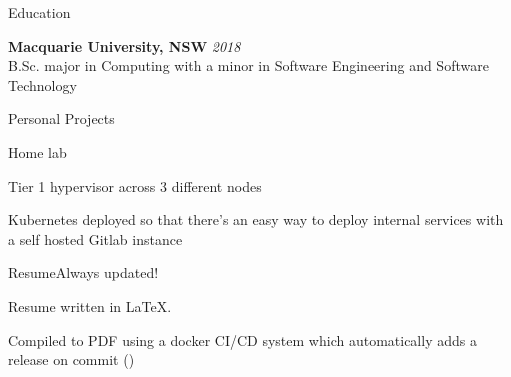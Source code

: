 \documentclass{resume} %
\begin{document}
    
    \begin{rSection}{Education}
    
        {\bf Macquarie University, NSW} \hfill {\em 2018} \\ 
        B.Sc. major in Computing with a minor in Software Engineering and Software Technology\\
        
        \end{rSection}
    
    
    \begin{rSection}{Personal Projects}
    
   
   
    \begin{rSubsection}{Home lab}{}{}{}{}{}
    \item Tier 1 hypervisor across 3 different nodes
    \item Kubernetes deployed so that there's an easy way to deploy internal services with a self hosted Gitlab instance 
    \end{rSubsection}
   
    \begin{rSubsection}{Resume}{Always updated!}{\href{https://github.com/Tyler-Cash/Latex-Resume}{\color{blue}{Github Repository}}}{}
    \item Resume written in LaTeX.
    \item Compiled to PDF using a docker CI/CD system which automatically adds a release on commit (\href{https://github.com/Tyler-Cash/Latex-Resume/releases}{\color{blue}{link}})
    \end{rSubsection}
    
    \end{rSection}
    
    
\end{document}
